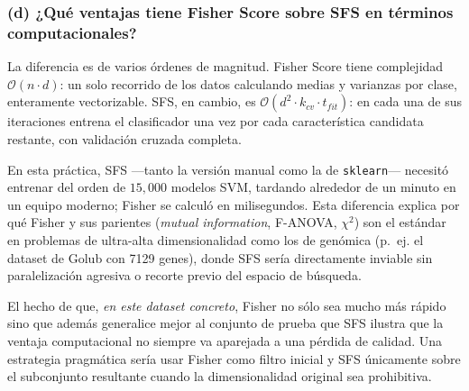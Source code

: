 \subsubsection*{(d) ¿Qué ventajas tiene Fisher Score sobre SFS en términos computacionales?}

La diferencia es de varios órdenes de magnitud. Fisher Score tiene
complejidad $\mathcal{O}(n \cdot d)$: un solo recorrido de los datos
calculando medias y varianzas por clase, enteramente vectorizable. SFS,
en cambio, es $\mathcal{O}(d^2 \cdot k_{cv} \cdot t_{fit})$: en cada una
de sus iteraciones entrena el clasificador una vez por cada característica
candidata restante, con validación cruzada completa.

En esta práctica, SFS ---tanto la versión manual como la de
\texttt{sklearn}--- necesitó entrenar del orden de $15{,}000$ modelos
SVM, tardando alrededor de un minuto en un equipo moderno; Fisher se
calculó en milisegundos. Esta diferencia explica por qué Fisher y sus
parientes (\textit{mutual information}, F-ANOVA, $\chi^2$) son el
estándar en problemas de ultra-alta dimensionalidad como los de genómica
(p.~ej. el dataset de Golub con 7129 genes), donde SFS sería directamente
inviable sin paralelización agresiva o recorte previo del espacio de
búsqueda.

El hecho de que, \emph{en este dataset concreto}, Fisher no sólo sea
mucho más rápido sino que además generalice mejor al conjunto de prueba
que SFS ilustra que la ventaja computacional no siempre va aparejada a
una pérdida de calidad. Una estrategia pragmática sería usar Fisher como
filtro inicial y SFS únicamente sobre el subconjunto resultante cuando la
dimensionalidad original sea prohibitiva.